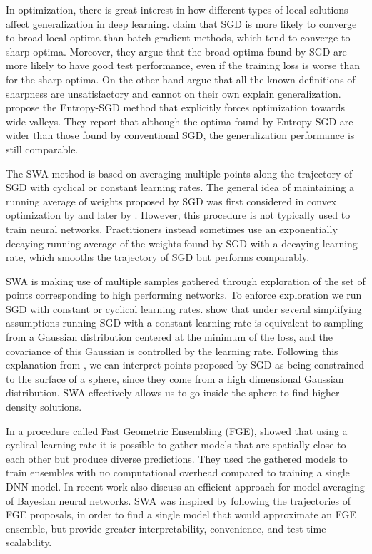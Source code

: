 \documentclass[letterpaper]{article}
\begin{document}
In optimization, there is great interest in how different types of local solutions 
affect generalization in deep learning. \citet{keskar2017large} claim that 
SGD is more likely to converge to broad local optima than batch gradient
methods, which tend to converge to sharp optima.  Moreover, they argue 
that the broad optima found by SGD are more likely to have good test 
performance, even if the training loss is worse than for the sharp optima.
On the other hand \citet{dinh2017} argue that all the known
definitions of sharpness are unsatisfactory and cannot on their own explain 
generalization.
\citet{chaudhari2016} propose the Entropy-SGD method that
explicitly forces optimization towards wide valleys. They report that although the 
optima found by Entropy-SGD are wider than those found by conventional SGD, 
the generalization performance is still comparable.

The SWA method is based on averaging multiple points along the trajectory
of SGD with cyclical or constant learning rates.  The general idea of maintaining
a running average of weights proposed by SGD was first considered in convex 
optimization by \citet{ruppert1988} and later by \citet{polyak1992}.  
However, this procedure is not typically used to train neural networks. Practitioners instead sometimes
use an exponentially decaying running average of the weights found by SGD with 
a decaying learning rate, which smooths the trajectory of SGD but performs comparably.

SWA is making use of multiple samples gathered through exploration of the 
set of points corresponding to high performing networks. To enforce exploration
we run SGD with constant or cyclical learning rates. \citet{mandt2017stochastic} 
show that under several simplifying assumptions running SGD with a constant
learning rate is equivalent to sampling from a Gaussian distribution centered
at the minimum of the loss, and the covariance of this Gaussian is controlled
by the learning rate. Following this explanation from \citep{mandt2017stochastic},
we can interpret points proposed by SGD as being constrained to the surface of a sphere, 
since they come from a high dimensional Gaussian distribution.  SWA effectively allows
us to go inside the sphere to find higher density solutions.

In a procedure called Fast Geometric Ensembling (FGE), \citet{garipov2018} showed that using a cyclical learning
rate it is possible to gather models that are spatially close to each other
but produce diverse predictions. They used the gathered models to train 
ensembles with no computational overhead compared to training a single 
DNN model.  In recent work \citet{neklyudov2018} also discuss an efficient approach
for model averaging of Bayesian neural networks.  SWA was inspired by 
following the trajectories of FGE proposals, in order to find a single model
that would approximate an FGE ensemble, but provide greater interpretability, convenience, and test-time 
scalability. 
\end{document}
